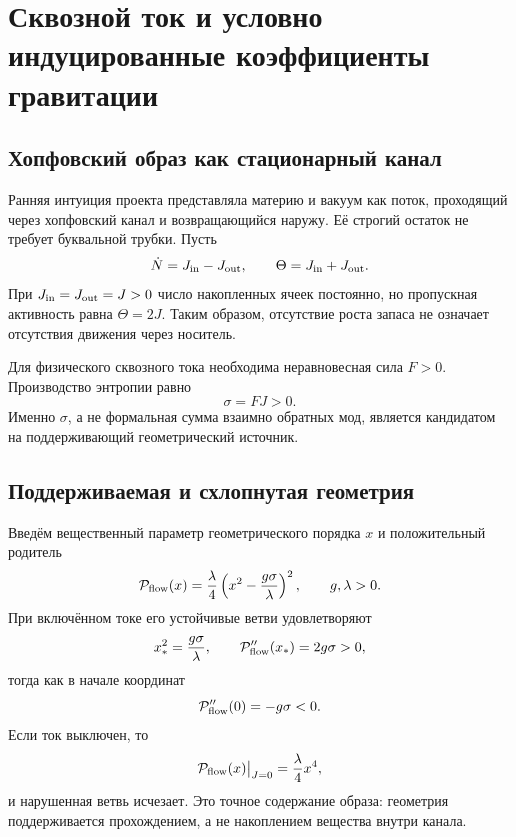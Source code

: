 \chapter{Сквозной ток и условно индуцированные коэффициенты гравитации}
\label{ch:v10-throughflow-induced-gravity-coefficients}

\section{Хопфовский образ как стационарный канал}

Ранняя интуиция проекта представляла материю и вакуум как поток,
проходящий через хопфовский канал и возвращающийся наружу. Её строгий остаток
не требует буквальной трубки. Пусть
\begin{equation}
 \dot N=J_{\rm in}-J_{\rm out},
 \qquad \Theta=J_{\rm in}+J_{\rm out}.
 \label{eq:v10-throughflow-balance}
\end{equation}
При $J_{\rm in}=J_{\rm out}=J>0$ число накопленных ячеек постоянно, но
пропускная активность равна $\Theta=2J$. Таким образом, отсутствие роста
запаса не означает отсутствия движения через носитель.

Для физического сквозного тока необходима неравновесная сила $F>0$.
Производство энтропии равно
\begin{equation}
 \sigma=FJ>0.
 \label{eq:v10-throughflow-entropy-production}
\end{equation}
Именно $\sigma$, а не формальная сумма взаимно обратных мод, является
кандидатом на поддерживающий геометрический источник.

\section{Поддерживаемая и схлопнутая геометрия}

Введём вещественный параметр геометрического порядка $x$ и положительный
родитель
\begin{equation}
 \mathcal P_{\rm flow}(x)
 =\frac{\lambda}{4}\left(x^2-\frac{g\sigma}{\lambda}\right)^2,
 \qquad g,\lambda>0.
 \label{eq:v10-throughflow-order-parent}
\end{equation}
При включённом токе его устойчивые ветви удовлетворяют
\begin{equation}
 x_*^2=\frac{g\sigma}{\lambda},
 \qquad
 \mathcal P_{\rm flow}''(x_*)=2g\sigma>0,
 \label{eq:v10-throughflow-maintained-geometry}
\end{equation}
тогда как в начале координат
\begin{equation}
 \mathcal P_{\rm flow}''(0)=-g\sigma<0.
\end{equation}
Если ток выключен, то
\begin{equation}
 \mathcal P_{\rm flow}(x)\big|_{J=0}=\frac{\lambda}{4}x^4,
 \label{eq:v10-throughflow-collapse}
\end{equation}
и нарушенная ветвь исчезает. Это точное содержание образа: геометрия
поддерживается прохождением, а не накоплением вещества внутри канала.

